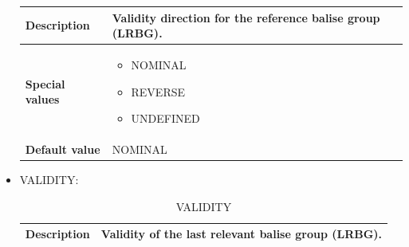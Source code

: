 \documentclass{template/openetcs}
\begin{document}
\begin{itemize}
\begin{longtable}{|l|l|}
					\begin{minipage}[t]{0.22\linewidth} \textbf{Description} \end{minipage} 
				&	\begin{minipage}[t]{0.78\linewidth} Validity direction for the reference balise group (LRBG). \end{minipage} \\
				
				\hline
																																									
					\begin{minipage}[t]{0.22\linewidth} \textbf{Special values}	\end{minipage} 
				&	\begin{minipage}[t]{0.78\linewidth} \begin{itemize} \item NOMINAL \item REVERSE \item UNDEFINED \end{itemize} \end{minipage} \\
				
				\hline
				
					\begin{minipage}[t]{0.22\linewidth} \textbf{Default value}	\end{minipage} 
				&	\begin{minipage}[t]{0.78\linewidth} NOMINAL \end{minipage} \\
				
				\hline
				
			\end{longtable}
		
		\item VALIDITY:
																	
			\begin{longtable}{|l|l|}
				\caption{VALIDITY}\\ 
				\hline
				
					\begin{minipage}[t]{0.22\linewidth} \textbf{Description} \end{minipage} 
				&	\begin{minipage}[t]{0.78\linewidth} Validity of the last relevant balise group (LRBG). \end{minipage} \\
				
				\hline
																																									

\end{longtable}
\end{itemize}
\end{document}
